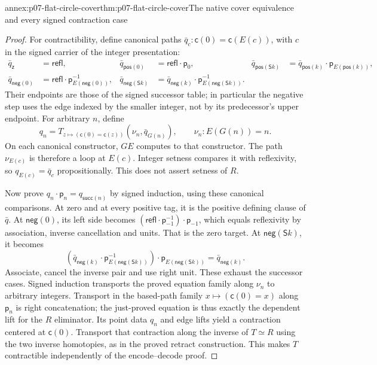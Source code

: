 \begin{annexitem}{annex:p07-flat-circle-cover}{thm:p07-flat-circle-cover}{The native cover equivalence and every signed contraction case}
\begin{proof}
For contractibility, define canonical paths
\(\bar q_c:\mathsf c(0)=\mathsf c(E(c))\), with \(c\) in the
signed carrier of the integer presentation:
\[
\begin{aligned}
\bar q_{\mathsf z}&=\mathsf{refl},&
\bar q_{\mathsf{pos}(0)}&=\mathsf{refl}\cdot\mathsf p_0,&
\bar q_{\mathsf{pos}(\mathsf Sk)}
  &=\bar q_{\mathsf{pos}(k)}\cdot\mathsf p_{E(\mathsf{pos}(k))},\\
\bar q_{\mathsf{neg}(0)}
  &=\mathsf{refl}\cdot\mathsf p_{E(\mathsf{neg}(0))}^{-1},&
\bar q_{\mathsf{neg}(\mathsf Sk)}
  &=\bar q_{\mathsf{neg}(k)}
       \cdot\mathsf p_{E(\mathsf{neg}(\mathsf Sk))}^{-1}.
\end{aligned}
\]
Their endpoints are those of the signed successor table; in
particular the negative step uses the edge indexed by the smaller
integer, not by its predecessor's upper endpoint.
For arbitrary \(n\), define
\[
q_n=T_{z\mapsto(\mathsf c(0)=\mathsf c(z))}
          (\nu_n,\bar q_{G(n)}),
\qquad \nu_n:E(G(n))=n.
\]
On each canonical constructor, \(GE\) computes to that constructor.
The path \(\nu_{E(c)}\) is therefore a loop at \(E(c)\).
Integer setness compares it with reflexivity, so
\(q_{E(c)}=\bar q_c\) propositionally. This does not assert
setness of \(R\).

Now prove \(q_n\cdot\mathsf p_n=q_{\mathsf{succ}(n)}\) by
signed induction, using these canonical comparisons.
At zero and at every positive tag, it is the positive defining
clause of \(\bar q\).
At \(\mathsf{neg}(0)\), its left side becomes
\((\mathsf{refl}\cdot\mathsf p_{-1}^{-1})\cdot\mathsf p_{-1}\),
which equals reflexivity by association, inverse cancellation
and units. That is the zero target.
At \(\mathsf{neg}(\mathsf Sk)\), it becomes
\[
(\bar q_{\mathsf{neg}(k)}
       \cdot\mathsf p_{E(\mathsf{neg}(\mathsf Sk))}^{-1})
       \cdot\mathsf p_{E(\mathsf{neg}(\mathsf Sk))}
 =\bar q_{\mathsf{neg}(k)}.
\]
Associate, cancel the inverse pair and use right unit.
These exhaust the successor cases. Signed induction transports
the proved equation family along \(\nu_n\) to arbitrary integers.
Transport in the based-path family \(x\mapsto(\mathsf c(0)=x)\)
along \(\mathsf p_n\) is right concatenation; the just-proved
equation is thus exactly the dependent lift for the \(R\) eliminator.
Its point data \(q_n\) and edge lifts yield a contraction centered
at \(\mathsf c(0)\).
Transport that contraction along the inverse of \(T\simeq R\)
using the two inverse homotopies, as in the proved retract
construction. This makes \(T\) contractible independently of
the encode--decode proof.
\end{proof}
\end{annexitem}

